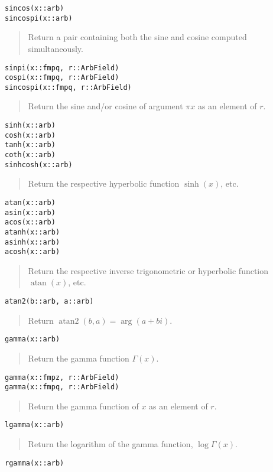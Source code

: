 \documentclass[a4paper,10pt]{article}
\newcommand{\desc}[1]{\vspace{-3mm}\begin{quote}#1\end{quote}}
\begin{document}
{{\begin{lstlisting}
sincos(x::arb)
sincospi(x::arb)
\end{lstlisting}

\desc{Return a pair containing both the sine and cosine computed simultaneously.}

\begin{lstlisting}
sinpi(x::fmpq, r::ArbField)
cospi(x::fmpq, r::ArbField)
sincospi(x::fmpq, r::ArbField)
\end{lstlisting}

\desc{Return the sine and/or cosine of argument $\pi x$ as an element of $r$.}

\begin{lstlisting}
sinh(x::arb)
cosh(x::arb)
tanh(x::arb)
coth(x::arb)
sinhcosh(x::arb)
\end{lstlisting}

\desc{Return the respective hyperbolic function $\sinh(x)$, etc.}

\begin{lstlisting}
atan(x::arb)
asin(x::arb)
acos(x::arb)
atanh(x::arb)
asinh(x::arb)
acosh(x::arb)
\end{lstlisting}

\desc{Return the respective inverse trigonometric or hyperbolic function
$\operatorname{atan}(x)$, etc.}

\begin{lstlisting}
atan2(b::arb, a::arb)
\end{lstlisting}

\desc{Return $\operatorname{atan2}(b,a) = \arg(a+bi)$.}

\begin{lstlisting}
gamma(x::arb)
\end{lstlisting}

\desc{Return the gamma function $\Gamma(x)$.}

\begin{lstlisting}
gamma(x::fmpz, r::ArbField)
gamma(x::fmpq, r::ArbField)
\end{lstlisting}

\desc{Return the gamma function of $x$ as an element of $r$.}

\begin{lstlisting}
lgamma(x::arb)
\end{lstlisting}

\desc{Return the logarithm of the gamma function, $\log \Gamma(x)$.}

\begin{lstlisting}
rgamma(x::arb)
\end{lstlisting}

}}
\end{document}
